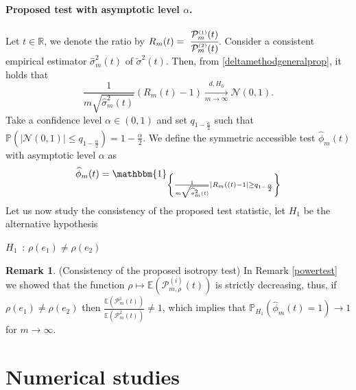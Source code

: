 \documentclass[12pt]{article}
\renewcommand{\tilde}{\widetilde}
\renewcommand{\hat}{\widehat}
\theoremstyle{Theorem}
\theoremstyle{definition}
\newtheorem{remark}{Remark}
\begin{document}
\paragraph{Proposed test with asymptotic level $\alpha$.} Let $t \in \mathbb{R}$,  we denote the ratio by $R_{m}(t) =~\cfrac{\mathcal{P}^{\scriptscriptstyle  (1) }_{m}(t)}{\mathcal{P}^{\scriptscriptstyle  (2) }_{m}(t)}$.
Consider a consistent empirical estimator $\hat{\sigma}^{2}_{m}(t)$ of $\tilde{\sigma}^{2}(t)$. Then, from \ref{deltamethodgeneralprop}, it holds that 
$$ \frac{1}{m\sqrt{\hat{\sigma}^{2}_{m}(t)}}\left(R_{m}(t) - 1 \right)  \xrightarrow[m \to \infty]{d, H_{0}} \mathcal{N}\left(0, 1 \right).$$
Take a confidence level $\alpha \in (0,1)$ and set $q_{1-\frac{\alpha}{2}}$ such that $\mathbb{P}\left(|\mathcal{N}\left(0,1\right)| \leq  q_{1-\frac{\alpha}{2}} \right) = 1 - \frac{\alpha}{2}$. We define the symmetric accessible test $\hat{\phi}_{m}(t)$ with asymptotic level $\alpha$ as 
\begin{equation}
\label{phihat}
\hat{\phi}_{m}(t)= \mathbbm{1}_{\left\{ \frac{1}{m\sqrt{\hat{\sigma}^{2}_{m}(t)}}\left|R_{m}((t) - 1 \right| \geq q_{1- \frac{\alpha}{2}} \right\}}
\end{equation}
Let us now study the consistency of the proposed test statistic, let $H_{1}$ be the alternative hypothesis
\begin{center}
$H_{1}$\, :\; $\rho(e_1) \neq \rho(e_2)$
\end{center} 
\begin{remark}(Consistency of the proposed isotropy test) In Remark \ref{powertest} we showed that the function $\rho \mapsto \mathbb{E}\left(\mathcal{P}^{\scriptscriptstyle (i)}_{m, \rho}(t)\right)$ is strictly decreasing, thus, if $\rho(e_1) \neq \rho(e_2)$ then $\frac{\mathbb{E}\left(\mathcal{P}^{1}_{m}(t)\right)}{\mathbb{E}\left(\mathcal{P}_{m}^{2}(t)\right)} \neq 1$, which implies that $\mathbb{P}_{H_{1}}\left(\hat{\phi}_{m}(t) = 1\right) \to 1$ for $m\to \infty$. 
\end{remark}
\section{Numerical studies}
\end{document}
